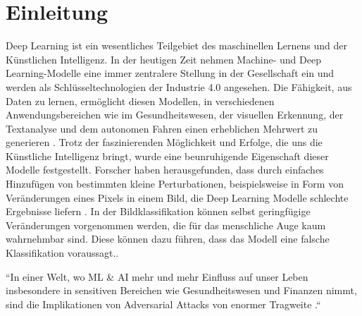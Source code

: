 \section{Einleitung} 

Deep Learning ist ein wesentliches Teilgebiet des maschinellen Lernens und der Künstlichen Intelligenz. In der heutigen Zeit nehmen Machine- und Deep Learning-Modelle eine immer zentralere Stellung in der Gesellschaft ein und werden als Schlüsseltechnologien der Industrie 4.0 angesehen. Die Fähigkeit, aus Daten zu lernen, ermöglicht diesen Modellen, in verschiedenen Anwendungsbereichen wie im Gesundheitswesen, der visuellen Erkennung, der Textanalyse und dem autonomen Fahren einen erheblichen Mehrwert zu generieren \cite{sarker_deep_2021}. Trotz der faszinierenden Möglichkeit und Erfolge, die uns die Künstliche Intelligenz bringt, wurde eine beunruhigende Eigenschaft dieser Modelle festgestellt. Forscher haben herausgefunden, dass durch einfaches Hinzufügen von bestimmten kleine Perturbationen, beispielsweise in Form von Veränderungen eines Pixels in einem Bild, die Deep Learning Modelle schlechte Ergebnisse liefern \cite{szegedy_intriguing_2014}. In der Bildklassifikation können selbst geringfügige Veränderungen vorgenommen werden, die für das menschliche Auge kaum wahrnehmbar sind. Diese können dazu führen, dass das Modell eine falsche Klassifikation voraussagt.\cite{perruchoud_24fs_i4ds27_2023}. 

``In einer Welt, wo ML \& AI mehr und mehr Einfluss auf unser Leben insbesondere in sensitiven Bereichen wie Gesundheitswesen und Finanzen nimmt, sind die Implikationen von Adversarial Attacks von enormer Tragweite \cite{perruchoud_24fs_i4ds27_2023}.`` 
